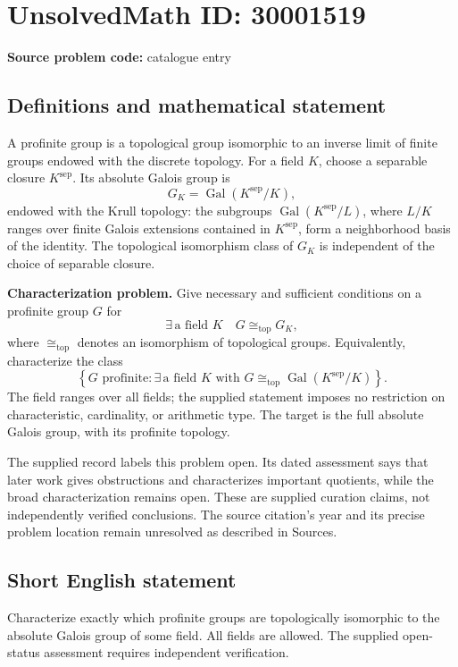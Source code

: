 \documentclass[11pt]{article}
\begin{document}
\section*{UnsolvedMath ID: 30001519}
\textbf{Source problem code:} catalogue entry
\subsection{Definitions and mathematical statement}
A profinite group is a topological group isomorphic to an inverse limit of finite groups endowed with the discrete topology. For a field \(K\), choose a separable closure \(K^{\mathrm{sep}}\). Its absolute Galois group is
\[
G_K=\operatorname{Gal}(K^{\mathrm{sep}}/K),
\]
endowed with the Krull topology: the subgroups \(\operatorname{Gal}(K^{\mathrm{sep}}/L)\), where \(L/K\) ranges over finite Galois extensions contained in \(K^{\mathrm{sep}}\), form a neighborhood basis of the identity. The topological isomorphism class of \(G_K\) is independent of the choice of separable closure.

\textbf{Characterization problem.} Give necessary and sufficient conditions on a profinite group \(G\) for
\[
\exists\,\text{a field }K\quad G\cong_{\mathrm{top}}G_K,
\]
where \(\cong_{\mathrm{top}}\) denotes an isomorphism of topological groups. Equivalently, characterize the class
\[
\left\{G\text{ profinite}:\exists\,\text{a field }K\text{ with }G\cong_{\mathrm{top}}\operatorname{Gal}(K^{\mathrm{sep}}/K)\right\}.
\]
The field ranges over all fields; the supplied statement imposes no restriction on characteristic, cardinality, or arithmetic type. The target is the full absolute Galois group, with its profinite topology.

The supplied record labels this problem open. Its dated assessment says that later work gives obstructions and characterizes important quotients, while the broad characterization remains open. These are supplied curation claims, not independently verified conclusions. The source citation's year and its precise problem location remain unresolved as described in Sources.
\subsection{Short English statement}
Characterize exactly which profinite groups are topologically isomorphic to the absolute Galois group of some field. All fields are allowed. The supplied open-status assessment requires independent verification.
\end{document}
